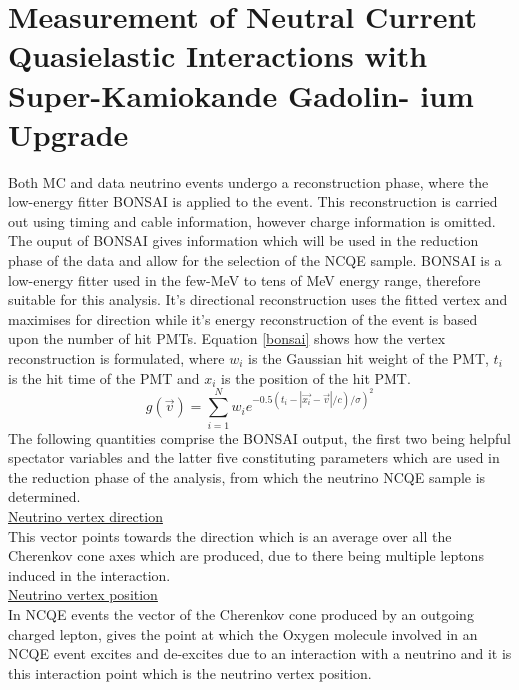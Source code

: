 \chapter{Measurement of Neutral Current Quasielastic
Interactions with Super-Kamiokande Gadolin-
ium Upgrade}
\label{chp:ncqegd}

Both MC and data neutrino events undergo a reconstruction phase, where the low-energy fitter BONSAI is applied to the event. This reconstruction is carried out using timing and cable information, however charge information is omitted. The ouput of BONSAI gives information which will be used in the reduction phase of the data and allow for the selection of the NCQE sample. BONSAI is a low-energy fitter used in the few-MeV to tens of MeV energy range, therefore suitable for this analysis. It's directional reconstruction uses the fitted vertex and maximises for direction while it's energy reconstruction of the event is based upon the number of hit PMTs. Equation \ref{bonsai} shows how the vertex reconstruction is formulated, where $w_{i}$ is the Gaussian hit weight of the PMT, $t_{i}$ is the hit time of the PMT and $x_{i}$ is the position of the hit PMT.
\newline
\begin{equation}
\label{bonsai}
g(\vec{v})=\sum_{i=1}^{N} w_{i} e^{\left.-0.5\left(t_{i}-\left|\overrightarrow{x_{i}}-\vec{v}\right| / c\right) / \sigma\right)^{2}}
\end{equation}
The following quantities comprise the BONSAI output, the first two being helpful spectator variables and the latter five constituting parameters which are used in the reduction phase of the analysis, from which the neutrino NCQE sample is determined.\\

\underline{Neutrino vertex direction}\\

This vector points towards the direction which is an average over all the Cherenkov cone axes which are produced, due to there being multiple leptons induced in the interaction.\\



\underline{Neutrino vertex position}\\
In NCQE events the vector of the Cherenkov cone produced by an outgoing charged lepton, gives the point at which the Oxygen molecule involved in an NCQE event excites and de-excites due to an interaction with a neutrino and it is this interaction point which is the neutrino vertex position.
\newline

